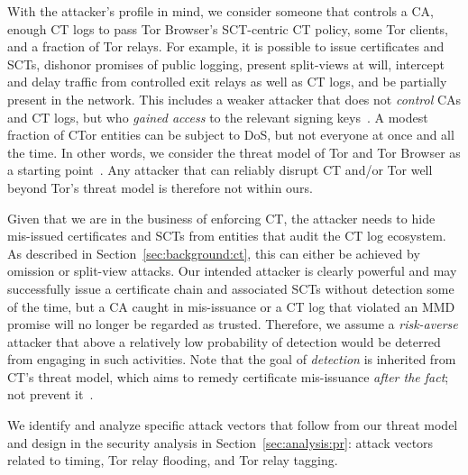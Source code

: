 With
the attacker's profile in mind, we consider someone that controls
	a CA,
	enough CT logs to pass Tor Browser's SCT-centric CT policy, 
	some Tor clients, and
	a fraction of Tor relays.
For example, it is possible to
	issue certificates and SCTs,
	dishonor promises of public logging,
	present split-views at will,
	intercept and delay traffic from controlled exit relays as well as CT logs,
		and
	be partially present in the network.
This includes a weaker attacker that does not \emph{control} CAs and CT logs,
but who \emph{gained access} to the relevant signing keys~\cite{turktrust,%
gdca1-omission}.  A modest fraction of CTor entities can be subject to DoS, but
not everyone at once and all the time.  In other words, we consider the threat
model of Tor and Tor Browser as a starting point~\cite{tor,tor-browser}.  Any
attacker that can reliably disrupt CT and/or Tor well beyond Tor's threat
model is therefore not within ours.

%
%
Given that we are in the business of enforcing CT, the attacker needs to hide
mis-issued certificates and SCTs from entities that audit the CT log ecosystem.
As described in Section~\ref{sec:background:ct}, this can either be achieved by
omission or split-view attacks.  Our intended attacker is clearly powerful and
may successfully issue a certificate chain and associated SCTs without detection
some of the time, but a CA caught in mis-issuance or a CT log that violated an
MMD promise will no longer be regarded as trusted.  Therefore, we assume a
\emph{risk-averse} attacker that above a relatively low probability of detection
would be deterred from engaging in such activities. Note that the goal of
\emph{detection} is inherited from CT's threat model, which aims to remedy
certificate mis-issuance \emph{after the fact}; not prevent it~\cite{ct/a}.

%
%
We identify and analyze specific attack vectors that follow from our threat
model and design in the security analysis in Section~\ref{sec:analysis:pr}:
attack vectors related to timing, Tor relay flooding, and Tor relay tagging.


